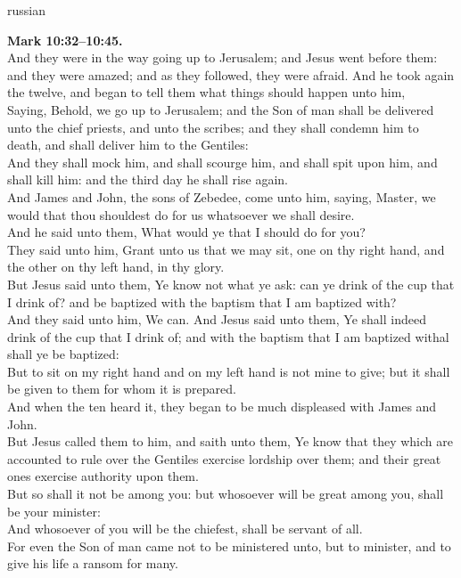 \documentclass[10pt]{article} %
\begin{document}
{\begin{minipage}[t]{0.48\textwidth}
\begin{otherlanguage*}{russian}
\end{otherlanguage*}
\end{minipage}
\hfill
\begin{minipage}[t]{0.45\textwidth}

\textbf{Mark 10:32--10:45.}\\
And they were in the way going up to Jerusalem; and Jesus went before them: and they were amazed; and as they followed, they were afraid. And he took again the twelve, and began to tell them what things should happen unto him,\\
Saying, Behold, we go up to Jerusalem; and the Son of man shall be delivered unto the chief priests, and unto the scribes; and they shall condemn him to death, and shall deliver him to the Gentiles:\\
And they shall mock him, and shall scourge him, and shall spit upon him, and shall kill him: and the third day he shall rise again.\\
And James and John, the sons of Zebedee, come unto him, saying, Master, we would that thou shouldest do for us whatsoever we shall desire.\\
And he said unto them, What would ye that I should do for you?\\
They said unto him, Grant unto us that we may sit, one on thy right hand, and the other on thy left hand, in thy glory.\\
But Jesus said unto them, Ye know not what ye ask: can ye drink of the cup that I drink of? and be baptized with the baptism that I am baptized with?\\
And they said unto him, We can. And Jesus said unto them, Ye shall indeed drink of the cup that I drink of; and with the baptism that I am baptized withal shall ye be baptized:\\
But to sit on my right hand and on my left hand is not mine to give; but it shall be given to them for whom it is prepared.\\
And when the ten heard it, they began to be much displeased with James and John.\\
But Jesus called them to him, and saith unto them, Ye know that they which are accounted to rule over the Gentiles exercise lordship over them; and their great ones exercise authority upon them.\\
But so shall it not be among you: but whosoever will be great among you, shall be your minister:\\
And whosoever of you will be the chiefest, shall be servant of all.\\
For even the Son of man came not to be ministered unto, but to minister, and to give his life a ransom for many.\\

\end{minipage}}
\end{document}
